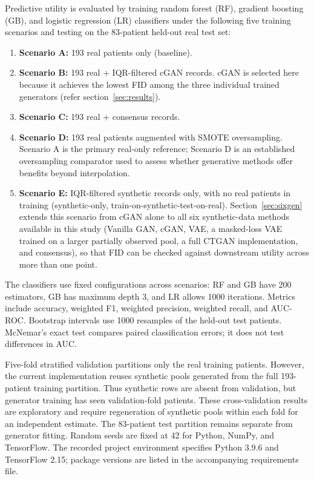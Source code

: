 \documentclass[journal]{IEEEtran}
\begin{document}
Predictive utility is evaluated by training random forest (RF), gradient boosting (GB), and logistic regression (LR) classifiers under the following five training scenarios and testing on the 83-patient held-out real test set:
\begin{enumerate}
  \item \textbf{Scenario A:} 193 real patients only (baseline).
  \item \textbf{Scenario B:} 193 real + IQR-filtered cGAN records. cGAN is selected here because it achieves the lowest FID among the three individual trained generators (refer section~\ref{sec:results}).
  \item \textbf{Scenario C:} 193 real + consensus records.
  \item \textbf{Scenario D:} 193 real patients augmented with SMOTE oversampling. Scenario A is the primary real-only reference; Scenario D is an established oversampling comparator used to assess whether generative methods offer benefits beyond interpolation.
  \item \textbf{Scenario E:} IQR-filtered synthetic records only, with no real patients in training (synthetic-only, train-on-synthetic-test-on-real). Section~\ref{sec:sixgen} extends this scenario from cGAN alone to all six synthetic-data methods available in this study (Vanilla GAN, cGAN, VAE, a masked-loss VAE trained on a larger partially observed pool, a full CTGAN implementation, and consensus), so that FID can be checked against downstream utility across more than one point.
\end{enumerate}
The classifiers use fixed configurations across scenarios: RF and GB have 200 estimators, GB has maximum depth 3, and LR allows 1000 iterations. Metrics include accuracy, weighted F1, weighted precision, weighted recall, and AUC-ROC. Bootstrap intervals use 1000 resamples of the held-out test patients. McNemar's exact test compares paired classification errors; it does not test differences in AUC.

Five-fold stratified validation partitions only the real training patients. However, the current implementation reuses synthetic pools generated from the full 193-patient training partition. Thus synthetic rows are absent from validation, but generator training has seen validation-fold patients. These cross-validation results are exploratory and require regeneration of synthetic pools within each fold for an independent estimate. The 83-patient test partition remains separate from generator fitting. Random seeds are fixed at 42 for Python, NumPy, and TensorFlow. The recorded project environment specifies Python 3.9.6 and TensorFlow 2.15; package versions are listed in the accompanying requirements file.
\end{document}
